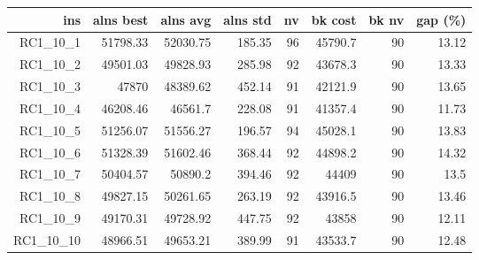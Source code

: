  \begin{table}[caption={Kết quả đo với tập HG\_RC\_1\_10 1000 yêu cầu}, label=exp:HGRC110]
    \centering
    \begin{tabular}{rrrrrrrr}
    \hline
    ins & alns best & alns avg & alns std & nv & bk cost & bk nv & gap (\%) \\ \hline
    RC1\_10\_1 & 51798.33 & 52030.75 & 185.35 & 96 & 45790.7 & 90 & 13.12 \\ \hline
    RC1\_10\_2 & 49501.03 & 49828.93 & 285.98 & 92 & 43678.3 & 90 & 13.33 \\ \hline
    RC1\_10\_3 & 47870 & 48389.62 & 452.14 & 91 & 42121.9 & 90 & 13.65 \\ \hline
    RC1\_10\_4 & 46208.46 & 46561.7 & 228.08 & 91 & 41357.4 & 90 & 11.73 \\ \hline
    RC1\_10\_5 & 51256.07 & 51556.27 & 196.57 & 94 & 45028.1 & 90 & 13.83 \\ \hline
    RC1\_10\_6 & 51328.39 & 51602.46 & 368.44 & 92 & 44898.2 & 90 & 14.32 \\ \hline
    RC1\_10\_7 & 50404.57 & 50890.2 & 394.46 & 92 & 44409 & 90 & 13.5 \\ \hline
    RC1\_10\_8 & 49827.15 & 50261.65 & 263.19 & 92 & 43916.5 & 90 & 13.46 \\ \hline
    RC1\_10\_9 & 49170.31 & 49728.92 & 447.75 & 92 & 43858 & 90 & 12.11 \\ \hline
    RC1\_10\_10 & 48966.51 & 49653.21 & 389.99 & 91 & 43533.7 & 90 & 12.48 \\ \hline
    \end{tabular}
  \end{table}